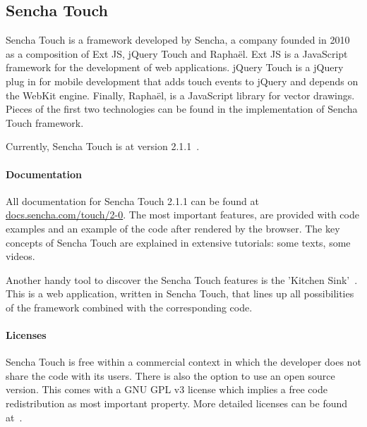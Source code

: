 \documentclass[a4paper]{article}
\renewcommand{\url}[1]{\href{http://#1}{#1}}
\begin{document}
\clearpage %

\subsection{Sencha Touch} %
\label{sec:sencha_touch}

Sencha Touch is a framework developed by Sencha,  a company founded in 2010 as a composition of Ext JS, jQuery Touch and Raphaël.  Ext JS is a JavaScript framework for the development of web applications.  jQuery Touch is a jQuery plug in for mobile development that adds touch events to jQuery and depends on the WebKit engine.  Finally,  Raphaël, is a JavaScript library for vector drawings.  Pieces of the first two technologies can be found in the implementation of Sencha Touch framework.    

Currently,  Sencha Touch is at version 2.1.1~\cite{Inc.}.

\paragraph{Documentation}
All documentation for Sencha Touch 2.1.1 can be found at \url{docs.sencha.com/touch/2-0}.  The most important features,  are provided with code examples and an example of the code after rendered by the browser.  The key concepts of Sencha Touch are explained in extensive tutorials:  some texts, some videos.  

Another handy tool to discover the Sencha Touch features is the 'Kitchen Sink'~\cite{Inc.2013}.  This is a web application,  written in Sencha Touch,  that lines up all possibilities of the framework combined with the corresponding code.


\paragraph{Licenses}
Sencha Touch is free within a commercial context in which the developer does not share the code with its users.  There is also the option to use an open source version.  This comes with a GNU GPL v3 license which implies a free code redistribution as most important property.
More detailed licenses can be found at~\cite{SenchaInc.}.
  
\end{document}

